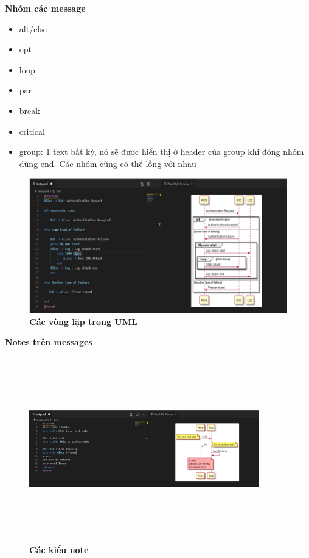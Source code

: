 \begin{enumerate}[a)]
\textbf{Nhóm các message}

\begin{adjustwidth}{1.5em}{}
  \begin{itemize}
    \item alt/else
    \item opt
    \item loop
    \item par
    \item break
    \item critical
    \item group: 1 text bất kỳ, nó sẽ được hiển thị ở header của group khi đóng nhóm dùng end. Các nhóm cũng có thể lồng với nhau
    
    
  \end{itemize}
  \end{adjustwidth}


  \begin{figure}[H]
    \centering
    \includegraphics[scale=0.5]{Images/appendix/plantuml_loops.png}
    \caption[Các vòng lặp trong UML]{\bfseries \fontsize{12pt}{0pt}
    \selectfont Các vòng lặp trong UML}
    \label{plantuml_object} %
  \end{figure}


  \textbf{Notes trên messages}
  
  \begin{figure}[H]
    \centering
    \includegraphics[width=10cm,height=8cm]{Images/appendix/plantuml_note.png}
    \caption[Các kiểu note]{\bfseries \fontsize{12pt}{0pt}
    \selectfont Các kiểu note}
    \label{plantuml_object} %
  \end{figure}



\end{enumerate}
